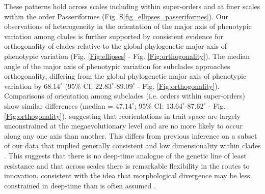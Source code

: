 \documentclass[12pt,letterpaper]{article}
\begin{document}
These patterns hold across scales including within super-orders and at finer scales within the order Passeriformes (Fig. S\ref{fig_ellipses_passeriformes}).
Our observations of heterogeneity in the orientation of the major axis of phenotypic variation among clades is further supported by consistent evidence for orthogonality of clades relative to the global phylogenetic major axis of phenotypic variation (Fig. \ref{Fig:ellipses} - Fig. \ref{Fig:orthogonality}).
The median angle of the major axis of phenotypic variation for subclades approaches orthogonality, differing from the global phylogenetic major axis of phenotypic variation by $68.14^\circ$ ($95$\% CI: $22.83^\circ$-$89.09^\circ$ - Fig. \ref{Fig:orthogonality}).
Comparisons of orientation among subclades (i.e. orders within super-orders) show similar differences (median = $47.14^\circ$; $95$\% CI: $13.64^\circ$-$87.62^\circ$ - Fig. \ref{Fig:orthogonality}), suggesting that reorientations in trait space are largely unconstrained at the megaevolutionary level and are no more likely to occur along any one axis than another.
This differs from previous inference on a subset of our data that implied generally consistent and low dimensionality within clades \cite{cooney2017mega}.
This suggests that there is no deep-time analogue of the genetic line of least resistance and that across scales there is remarkable flexibility in the routes to innovation, consistent with the idea that morphological divergence may be less constrained in deep-time than is often assumed \cite{venditti2011multiple}.
\end{document}
